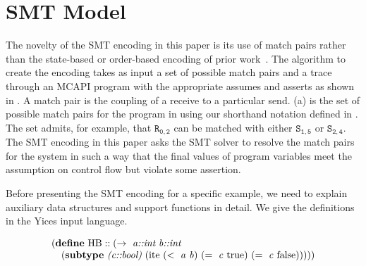 \section{SMT Model}\label{sec:smt}


The novelty of the SMT encoding in this paper is its use of match pairs rather than the state-based or order-based encoding of prior work~\cite{elwakil:padtad10,elwakil:atva10}. The algorithm to create the encoding takes as input a set of possible match pairs and a trace through an MCAPI program with the appropriate assumes and asserts as shown in . A match pair is the coupling of a receive to a particular send. (a) is the set of possible match pairs for the program in  using our shorthand notation defined in . The set admits, for example, that $\mathtt{R_{0,2}}$ can be matched with either $\mathtt{S_{1,5}}$ or $\mathtt{S_{2,4}}$. The SMT encoding in this paper asks the SMT solver to resolve the match pairs for the system in such a way that the final values of program variables meet the assumption on control flow but violate some assertion.

Before presenting the SMT encoding for a specific example, we need to explain auxiliary data structures and support functions in detail. We give the definitions in the Yices input language.

\begin{equation}
\begin{array}{l}
(\cfgt{define}\ \mathrm{HB}::(\rightarrow\ \cfgnt{a::int}\ \cfgnt{b::int}\\
\ \ \ (\cfgt{subtype}\ \cfgnt{(c::bool)}\ (\mathrm{ite}\ (<\ \mathit{a}\ \mathit{b})\ (=\ \mathit{c}\ \mathrm{true})\ (=\ \mathit{c}\ \mathrm{false})))))
\end{array}
\label{equation:hb}
\end{equation}


